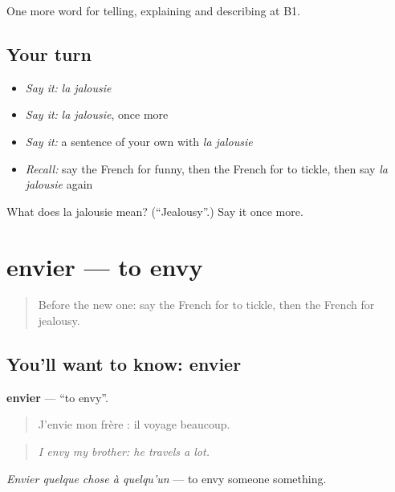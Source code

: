 \begin{grammarlens}[title={What you've built}]
One more word for telling, explaining and describing at B1.
\end{grammarlens}

\subsection*{Your turn}
\begin{itemize}
\raggedright
  \item \emph{Say it:} \emph{la jalousie}
  \item \emph{Say it:} \emph{la jalousie}, once more
  \item \emph{Say it:} a sentence of your own with \emph{la jalousie}
  \item \emph{Recall:} say the French for funny, then the French for to tickle, then say \emph{la jalousie} again
\end{itemize}

\begin{tcolorbox}[breakable,colback=teal!4,colframe=teal!35!black,title={Before you move on}]
What does la jalousie mean? (\textquotedblleft{}Jealousy\textquotedblright{}.) Say it once more.
\end{tcolorbox}
\section[envier]{envier — to envy}

\label{lesson:FR-C475-envier}



\begin{quote}
Before the new one: say the French for to tickle, then the French for jealousy.
\end{quote}

\subsection*{You'll want to know: envier}
\textbf{envier} — \textquotedblleft{}to envy\textquotedblright{}.

\begin{quote}
J'envie mon frère : il voyage beaucoup.
\end{quote}

\begin{quote}
\emph{I envy my brother: he travels a lot.}
\end{quote}

\emph{Envier quelque chose à quelqu'un} — to envy someone something.

